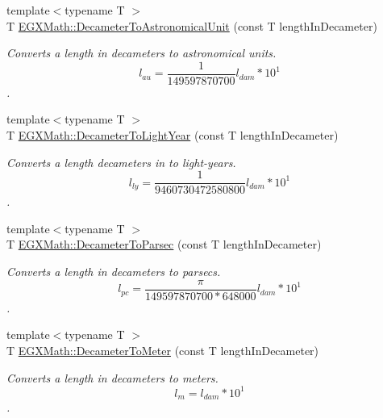 \begin{DoxyCompactItemize}
\item 
{\footnotesize template$<$typename T $>$ }\\T \mbox{\hyperlink{group___e_g_x_math-_conversions-_length_conversions-_s_i-_decameter-_astronomical_ga04365d1ba4f6dc4e7a607d720ccd807b}{E\+G\+X\+Math\+::\+Decameter\+To\+Astronomical\+Unit}} (const T length\+In\+Decameter)
\begin{DoxyCompactList}\small\item\em Converts a length in decameters to astronomical units. \[ l_{au}= \frac{1}{149597870700} l_{dam} * 10^{1} \]. \end{DoxyCompactList}\item 
{\footnotesize template$<$typename T $>$ }\\T \mbox{\hyperlink{group___e_g_x_math-_conversions-_length_conversions-_s_i-_decameter-_astronomical_gaf31492b0cfcc0ec057856854376a2ba6}{E\+G\+X\+Math\+::\+Decameter\+To\+Light\+Year}} (const T length\+In\+Decameter)
\begin{DoxyCompactList}\small\item\em Converts a length decameters in to light-\/years. \[ l_{ly}= \frac{1}{9460730472580800} l_{dam} * 10^{1} \]. \end{DoxyCompactList}\item 
{\footnotesize template$<$typename T $>$ }\\T \mbox{\hyperlink{group___e_g_x_math-_conversions-_length_conversions-_s_i-_decameter-_astronomical_ga50cf188f39f408c283b9a696ec44cee1}{E\+G\+X\+Math\+::\+Decameter\+To\+Parsec}} (const T length\+In\+Decameter)
\begin{DoxyCompactList}\small\item\em Converts a length in decameters to parsecs. \[ l_{pc}=\frac{\pi}{149597870700 * 648000} l_{dam} * 10^{1} \]. \end{DoxyCompactList}\item 
{\footnotesize template$<$typename T $>$ }\\T \mbox{\hyperlink{group___e_g_x_math-_conversions-_length_conversions-_s_i-_decameter-_s_i_gac7f762a09c6496efaab29ecdbfb88a2c}{E\+G\+X\+Math\+::\+Decameter\+To\+Meter}} (const T length\+In\+Decameter)
\begin{DoxyCompactList}\small\item\em Converts a length in decameters to meters. \[ l_{m}=l_{dam} * 10^{1} \]. \end{DoxyCompactList}\item 

\end{DoxyCompactItemize}

